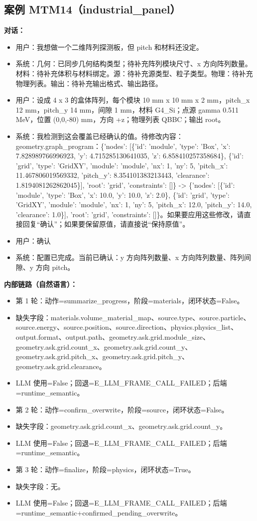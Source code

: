 \documentclass[11pt]{ctexart}
\begin{document}
\subsection{案例 MTM14（industrial\_panel）}
\textbf{对话：}
\begin{itemize}
\item 用户：我想做一个二维阵列探测板，但 pitch 和材料还没定。
\item 系统：几何：已同步几何结构类型；待补充阵列模块尺寸、x 方向阵列数量。材料：待补充体积与材料绑定。源：待补充源类型、粒子类型。物理：待补充物理列表。输出：待补充输出格式、输出路径。
\item 用户：设成 4 x 3 的盒体阵列，每个模块 10 mm x 10 mm x 2 mm，pitch\_x 12 mm，pitch\_y 14 mm，间隙 1 mm，材料 G4\_Si；点源 gamma 0.511 MeV，位置 (0,0,-80) mm，方向 +z；物理列表 QBBC；输出 root。
\item 系统：我检测到这会覆盖已经确认的值。待修改内容：geometry.graph\_program：\{'nodes': [\{'id': 'module', 'type': 'Box', 'x': 7.828989766996923, 'y': 4.715285130641035, 'z': 6.858410257358684\}, \{'id': 'grid', 'type': 'GridXY', 'module': 'module', 'nx': 1, 'ny': 5, 'pitch\_x': 11.467806019569332, 'pitch\_y': 8.354101383213443, 'clearance': 1.8194081262862045\}], 'root': 'grid', 'constraints': []\} -> \{'nodes': [\{'id': 'module', 'type': 'Box', 'x': 10.0, 'y': 10.0, 'z': 2.0\}, \{'id': 'grid', 'type': 'GridXY', 'module': 'module', 'nx': 1, 'ny': 5, 'pitch\_x': 12.0, 'pitch\_y': 14.0, 'clearance': 1.0\}], 'root': 'grid', 'constraints': []\}。如果要应用这些修改，请直接回复“确认”；如果要保留原值，请直接说“保持原值”。
\item 用户：确认
\item 系统：配置已完成。当前已确认：y 方向阵列数量、x 方向阵列数量、阵列间隙、y 方向 pitch。
\end{itemize}
\textbf{内部链路（自然语言）：}
\begin{itemize}
\item 第 1 轮：动作=summarize\_progress，阶段=materials，闭环状态=False。
\item 缺失字段：materials.volume\_material\_map、source.type、source.particle、source.energy、source.position、source.direction、physics.physics\_list、output.format、output.path、geometry.ask.grid.module\_size、geometry.ask.grid.count\_x、geometry.ask.grid.count\_y、geometry.ask.grid.pitch\_x、geometry.ask.grid.pitch\_y、geometry.ask.grid.clearance。
\item LLM 使用=False；回退=E\_LLM\_FRAME\_CALL\_FAILED；后端=runtime\_semantic。
\item 第 2 轮：动作=confirm\_overwrite，阶段=source，闭环状态=False。
\item 缺失字段：geometry.ask.grid.count\_x、geometry.ask.grid.count\_y。
\item LLM 使用=False；回退=E\_LLM\_FRAME\_CALL\_FAILED；后端=runtime\_semantic。
\item 第 3 轮：动作=finalize，阶段=physics，闭环状态=True。
\item 缺失字段：无。
\item LLM 使用=False；回退=E\_LLM\_FRAME\_CALL\_FAILED；后端=runtime\_semantic+confirmed\_pending\_overwrite。
\end{itemize}
\end{document}
